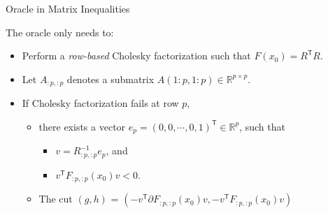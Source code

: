 \documentclass[10pt,ignorenonframetext,serif,onlymath]{beamer}
\providecommand{\tightlist}{%
  \setlength{\itemsep}{0pt}\setlength{\parskip}{0pt}}
\begin{document}
\begin{frame}{Oracle in Matrix Inequalities}
\protect\hypertarget{sec:oracle-in-matrix-inequalities}{}

The oracle only needs to:

\begin{itemize}
\tightlist
\item
  Perform a \emph{row-based} Cholesky factorization such that
  \(F(x_0) = R^\mathsf{T} R\).
\item
  Let \(A_{:p,:p}\) denotes a submatrix
  \(A(1:p, 1:p) \in \mathbb{R}^{p\times p}\).
\item
  If Cholesky factorization fails at row \(p\),

  \begin{itemize}
  \tightlist
  \item
    there exists a vector
    \(e_p = (0, 0, \cdots, 0, 1)^\mathsf{T} \in \mathbb{R}^p\), such that

    \begin{itemize}
    \tightlist
    \item
      \(v = R_{:p,:p}^{-1} e_p\), and
    \item
      \(v^\mathsf{T} F_{:p,:p}(x_0) v < 0\).
    \end{itemize}
  \item
    The cut \((g, h)\) =
    \((-v^\mathsf{T} \partial F_{:p,:p}(x_0) v, -v^\mathsf{T} F_{:p,:p}(x_0) v)\)
  \end{itemize}
\end{itemize}

\end{frame}
\end{document}

